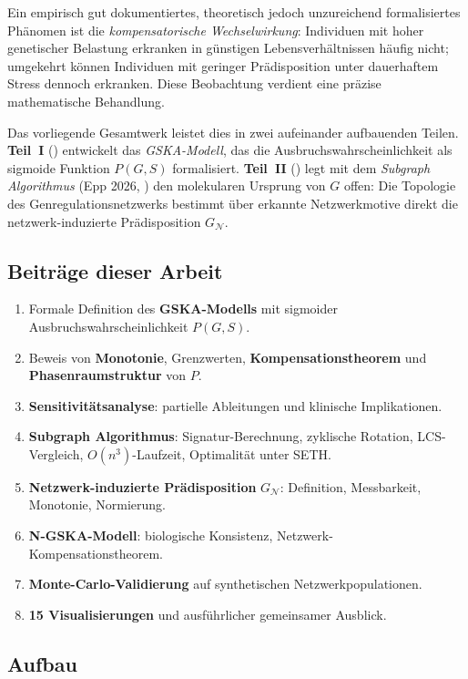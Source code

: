 ﻿\documentclass[12pt, a4paper]{article}
\theoremstyle{definition}
\theoremstyle{remark}
\newcommand{\calN}{\mathcal{N}}
\newcommand{\GN}{G_{\calN}}
\begin{document}
Ein empirisch gut dokumentiertes, theoretisch jedoch unzureichend formalisiertes
Phänomen ist die \emph{kompensatorische Wechselwirkung}: Individuen mit hoher
genetischer Belastung erkranken in günstigen Lebensverhältnissen häufig nicht;
umgekehrt können Individuen mit geringer Prädisposition unter dauerhaftem Stress
dennoch erkranken. Diese Beobachtung verdient eine präzise mathematische Behandlung.

Das vorliegende Gesamtwerk leistet dies in zwei aufeinander aufbauenden Teilen.
\textbf{Teil~I} () entwickelt das \emph{GSKA-Modell}, das die
Ausbruchswahrscheinlichkeit als sigmoide Funktion $P(G,S)$ formalisiert.
\textbf{Teil~II} () legt mit dem \emph{Subgraph Algorithmus}
(Epp 2026, \cite{epp2026sub}) den molekularen Ursprung von $G$ offen: Die
Topologie des Genregulationsnetzwerks bestimmt über erkannte Netzwerkmotive
direkt die netzwerk-induzierte Prädisposition $\GN$.

\subsection{Beiträge dieser Arbeit}

\begin{enumerate}[label=(\roman*)]
  \item Formale Definition des \textbf{GSKA-Modells} mit sigmoider
    Ausbruchswahrscheinlichkeit $P(G,S)$.
  \item Beweis von \textbf{Monotonie}, Grenzwerten, \textbf{Kompensationstheorem}
    und \textbf{Phasenraumstruktur} von $P$.
  \item \textbf{Sensitivitätsanalyse}: partielle Ableitungen und klinische
    Implikationen.
  \item \textbf{Subgraph Algorithmus}: Signatur-Berechnung, zyklische Rotation,
    LCS-Vergleich, $O(n^3)$-Laufzeit, Optimalität unter SETH.
  \item \textbf{Netzwerk-induzierte Prädisposition} $\GN$: Definition,
    Messbarkeit, Monotonie, Normierung.
  \item \textbf{N-GSKA-Modell}: biologische Konsistenz, Netzwerk-Kompensationstheorem.
  \item \textbf{Monte-Carlo-Validierung} auf synthetischen Netzwerkpopulationen.
  \item \textbf{15 Visualisierungen} und ausführlicher gemeinsamer Ausblick.
\end{enumerate}

\subsection{Aufbau}
\end{document}
